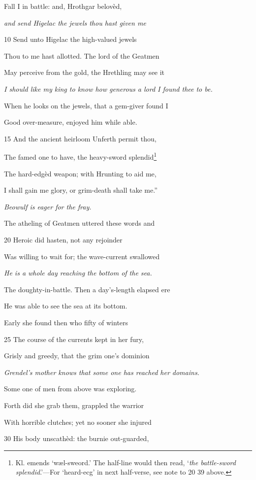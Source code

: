 Fall I in battle: and, Hrothgar belovèd,

\emph{and send Higelac
the jewels thou
hast given me}

10
Send unto Higelac the high-valued jewels

Thou to me hast allotted. The lord of the Geatmen

May perceive from the gold, the Hrethling may see it

\emph{I should like my
king to know how
generous a lord I
found thee to be.}

When he looks on the jewels, that a gem-giver found I

Good over-measure, enjoyed him while able.

15
And the ancient heirloom Unferth permit thou,

The famed one to have, the heavy-sword splendid\footnote{Kl. emends ‘wæl-sweord.’ The half-line would then read, ‘\emph{the battle-sword
splendid}.’—For ‘heard-ecg’ in next half-verse, see note to 20 39 above.}

The hard-edgèd weapon; with Hrunting to aid me,

I shall gain me glory, or grim-death shall take me.”

\emph{Beowulf is eager
for the fray.}

The atheling of Geatmen uttered these words and

20
Heroic did hasten, not any rejoinder

Was willing to wait for; the wave-current swallowed

\emph{He is a whole day
reaching the bottom
of the sea.}

The doughty-in-battle. Then a day’s-length elapsed ere

He was able to see the sea at its bottom.

Early she found then who fifty of winters

25
The course of the currents kept in her fury,

Grisly and greedy, that the grim one’s dominion

\emph{Grendel’s mother
knows that some
one has reached
her domains.}

Some one of men from above was exploring.

Forth did she grab them, grappled the warrior

With horrible clutches; yet no sooner she injured

30
His body unscathèd: the burnie out-guarded,


